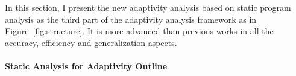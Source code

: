 In this section, I present the new 
adaptivity analysis based on static program analysis as the third part of 
the adaptivity analysis framework as in Figure~\ref{fig:structure}. 
It is more advanced than previous works in all the accuracy, efficiency and generalization aspects.
% 

% 


\paragraph{{Static Analysis for Adaptivity Outline}}


